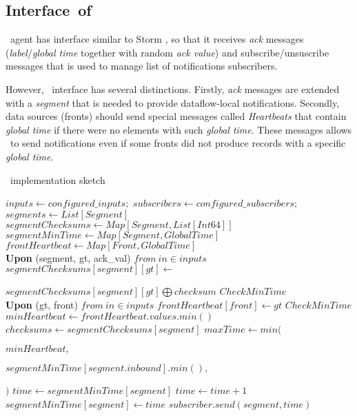 \subsection{Interface\ of\ \tracker\ }
\tracker\ agent has interface similar to Storm \acker, so that it receives \textit{ack} messages (\textit{label}/\textit{global time} together with random \textit{ack value}) and subscribe/unsuscribe messages that is used to manage list of notifications subscribers. 

However, \tracker\  interface has several distinctions. Firstly, \textit{ack} messages are extended with a \textit{segment} that is needed to provide dataflow-local notifications. Secondly, data sources (fronts) should send special messages called \textit{Heartbeats} that contain \textit{global time} if there were no elements with such \textit{global time}. These messages allows \tracker\ to send notifications even if some fronts did not produce records with a specific \textit{global time}. 

\begin{algorithm}
\caption{\tracker\ implementation sketch}
\label{tracker_algo}
\begin{algorithmic}[1]
\State $inputs \leftarrow configured\_inputs;$ 
\State $subscribers \leftarrow configured\_subscribers;$
\State $segments \leftarrow List[Segment]$
\State $segmentChecksums \leftarrow Map[Segment, List[Int64]]$
\State $segmentMinTime \leftarrow Map[Segment, GlobalTime]$
\State $frontHeartbeat \leftarrow Map[Front, GlobalTime]$
\\
\State \textbf{Upon} (segment, gt, ack\_val) $from \ in\in inputs$
\Indent
    \State $segmentChecksums[segment][gt] \gets $
    \par\Indent\Indent$segmentChecksums[segment][gt] \bigoplus checksum$\EndIndent\EndIndent
    \State $CheckMinTime$
\EndIndent
\\
\State \textbf{Upon} (gt, front) $from \ in\in inputs$
\Indent
 \State $frontHeartbeat[front] \leftarrow gt$
 \State $CheckMinTime$
\EndIndent
\\
\State $minHeartbeat \leftarrow frontHeartbeat.values.min()$
\State $checksums \gets segmentChecksums[segment]$
\State $maxTime \gets min($
\par\Indent\Indent$minHeartbeat,$\EndIndent\EndIndent
\par\Indent\Indent$segmentMinTime[segment.inbound].min(),$\EndIndent\EndIndent
\par\Indent$)$\EndIndent
\State $time \gets segmentMinTime[segment]$
\State $time \gets time + 1$
\EndWhile
{}
\State $segmentMinTime[segment] \gets time$
\State $subscriber.send(segment, time)$
\EndFor
\EndIf
\EndFor
\EndProcedure
\end{algorithmic}
\end{algorithm}


